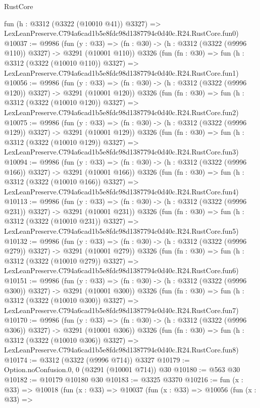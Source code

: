 \begin{lexlean}{RustCore}
\begin{coremodule}
    fun (h : @3312 (@3322 (@10010 @41)) @3327) =>
    LexLeanPreserve.C794a6cad1b5e8fdc98d1387794c0d40c.R24.RustCore.fun0)
@10037 := @9986
    (fun (y : @33) => (fn : @30) -> (h : @3312 (@3322 (@9996 @110)) @3327) -> @3291 (@10001 @110))
    @3326
    (fun (fn : @30) =>
    fun (h : @3312 (@3322 (@10010 @110)) @3327) =>
    LexLeanPreserve.C794a6cad1b5e8fdc98d1387794c0d40c.R24.RustCore.fun1)
@10056 := @9986
    (fun (y : @33) => (fn : @30) -> (h : @3312 (@3322 (@9996 @120)) @3327) -> @3291 (@10001 @120))
    @3326
    (fun (fn : @30) =>
    fun (h : @3312 (@3322 (@10010 @120)) @3327) =>
    LexLeanPreserve.C794a6cad1b5e8fdc98d1387794c0d40c.R24.RustCore.fun2)
@10075 := @9986
    (fun (y : @33) => (fn : @30) -> (h : @3312 (@3322 (@9996 @129)) @3327) -> @3291 (@10001 @129))
    @3326
    (fun (fn : @30) =>
    fun (h : @3312 (@3322 (@10010 @129)) @3327) =>
    LexLeanPreserve.C794a6cad1b5e8fdc98d1387794c0d40c.R24.RustCore.fun3)
@10094 := @9986
    (fun (y : @33) => (fn : @30) -> (h : @3312 (@3322 (@9996 @166)) @3327) -> @3291 (@10001 @166))
    @3326
    (fun (fn : @30) =>
    fun (h : @3312 (@3322 (@10010 @166)) @3327) =>
    LexLeanPreserve.C794a6cad1b5e8fdc98d1387794c0d40c.R24.RustCore.fun4)
@10113 := @9986
    (fun (y : @33) => (fn : @30) -> (h : @3312 (@3322 (@9996 @231)) @3327) -> @3291 (@10001 @231))
    @3326
    (fun (fn : @30) =>
    fun (h : @3312 (@3322 (@10010 @231)) @3327) =>
    LexLeanPreserve.C794a6cad1b5e8fdc98d1387794c0d40c.R24.RustCore.fun5)
@10132 := @9986
    (fun (y : @33) => (fn : @30) -> (h : @3312 (@3322 (@9996 @279)) @3327) -> @3291 (@10001 @279))
    @3326
    (fun (fn : @30) =>
    fun (h : @3312 (@3322 (@10010 @279)) @3327) =>
    LexLeanPreserve.C794a6cad1b5e8fdc98d1387794c0d40c.R24.RustCore.fun6)
@10151 := @9986
    (fun (y : @33) => (fn : @30) -> (h : @3312 (@3322 (@9996 @300)) @3327) -> @3291 (@10001 @300))
    @3326
    (fun (fn : @30) =>
    fun (h : @3312 (@3322 (@10010 @300)) @3327) =>
    LexLeanPreserve.C794a6cad1b5e8fdc98d1387794c0d40c.R24.RustCore.fun7)
@10170 := @9986
    (fun (y : @33) => (fn : @30) -> (h : @3312 (@3322 (@9996 @306)) @3327) -> @3291 (@10001 @306))
    @3326
    (fun (fn : @30) =>
    fun (h : @3312 (@3322 (@10010 @306)) @3327) =>
    LexLeanPreserve.C794a6cad1b5e8fdc98d1387794c0d40c.R24.RustCore.fun8)
@10174 := @3312 (@3322 (@9996 @714)) @3327
@10179 := Option.noConfusion.{0, 0} (@3291 (@10001 @714)) @30
@10180 := @563 @30
@10182 := @10179 @10180 @30
@10183 := @3325 @3370
@10216 := fun (x : @33) =>
  @10018
    (fun (x : @33) =>
    @10037
      (fun (x : @33) =>
      @10056
        (fun (x : @33) =>

\end{coremodule}
\end{lexlean}
